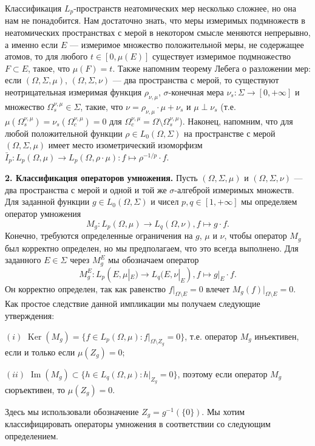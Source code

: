 \documentclass[11pt,twoside]{article}
\begin{document}
Классификация $L_p$-пространств неатомических мер несколько сложнее, но она нам не понадобится. Нам достаточно знать, что меры измеримых подмножеств в неатомических пространствах с мерой в некотором смысле меняются непрерывно, а именно если $E$ --- измеримое множество положительной меры, не содержащее атомов, то для любого $t\in[0,\mu(E)]$  существует измеримое подмножество $F\subset E$, такое, что $\mu(F)=t$.
  Также напомним теорему Лебега о разложении мер: если $(\Omega,\Sigma,\mu)$, $(\Omega,\Sigma,\nu)$ --- два пространства с мерой, то существуют неотрицательная измеримая функция $\rho_{\nu,\mu}$, $\sigma$-конечная мера $\nu_s:\Sigma\to[0,+\infty]$ и множество $\Omega_s^{\nu,\mu}\in\Sigma$, такие, что $\nu=\rho_{\nu,\mu}\cdot\mu+\nu_s$ и $\mu\perp\nu_s$ (т.е.  $\mu(\Omega_s^{\nu,\mu})=\nu_s(\Omega_c^{\nu,\mu})=0$ для $\Omega_c^{\nu,\mu}=\Omega\setminus \Omega_s^{\nu,\mu}$). Наконец, напомним, что для любой положительной функции $\rho\in L_0(\Omega,\Sigma)$ на пространстве с мерой $(\Omega,\Sigma,\mu)$ имеет место изометрический изоморфизм $\bar{I}_p:L_p(\Omega,\mu)\to L_p(\Omega,\rho\cdot\mu):f\mapsto \rho^{-1/p}\cdot f$.









\textbf{2. Классификация операторов умножения.} Пусть $(\Omega,\Sigma,\mu)$ и $(\Omega,\Sigma,\nu)$ --- два пространства с мерой и одной и той же $\sigma$-алгеброй измеримых множеств. Для заданной функции $g\in L_0(\Omega,\Sigma)$ и чисел $p,q\in[1,+\infty]$ мы определяем оператор умножения
$$
M_g:L_p(\Omega,\mu)\to L_q(\Omega,\nu), f\mapsto g\cdot f.
$$ 
Конечно, требуются определенные ограничения на $g$, $\mu$ и $\nu$, чтобы оператор $M_g$ был корректно определен, но мы предполагаем, что это всегда выполнено. Для заданного $E\in\Sigma$ через $M_g^E$ мы обозначаем оператор
$$
M_g^E:L_p(E,\mu|_E)\to L_q(E,\nu|_E),f\mapsto g|_E\cdot f.
$$
Он корректно определен, так как равенство $f|_{\Omega\setminus E}=0$ влечет $M_g(f)|_{\Omega\setminus E}=0$. Как простое следствие данной импликации мы получаем следующие утверждения:

$(i)$ $\operatorname{Ker}(M_g)=\{f\in L_p(\Omega,\mu):f|_{\Omega\setminus Z_g}=0\}$, т.е. оператор $M_g$ инъективен, если и только если $\mu(Z_g)=0$;

$(ii)$ $\operatorname{Im}(M_g)\subset\{h\in L_q(\Omega,\mu): h|_{Z_g}=0\}$, поэтому если оператор $M_g$ сюръективен, то $\mu(Z_g)=0$.

Здесь мы использовали обозначение $Z_g=g^{-1}(\{0\})$. Мы хотим классифицировать операторы умножения в соответствии со следующим определением.
\end{document}
